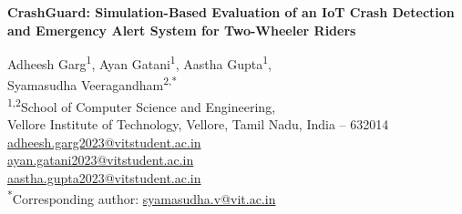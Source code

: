 \documentclass[10pt,a4paper]{article}
\begin{document}
\begin{center}
{\LARGE\bfseries CrashGuard: Simulation-Based Evaluation of an IoT Crash Detection and Emergency Alert System for Two-Wheeler Riders\par}
\vspace{6mm}
Adheesh Garg\textsuperscript{1}, Ayan Gatani\textsuperscript{1}, Aastha Gupta\textsuperscript{1},\\
Syamasudha Veeragandham\textsuperscript{2,*}\\[3mm]
\textsuperscript{1,2}School of Computer Science and Engineering,\\
Vellore Institute of Technology, Vellore, Tamil Nadu, India -- 632014\\[3mm]
{\small\href{mailto:adheesh.garg2023@vitstudent.ac.in}{adheesh.garg2023@vitstudent.ac.in}\\
\href{mailto:ayan.gatani2023@vitstudent.ac.in}{ayan.gatani2023@vitstudent.ac.in}\\
\href{mailto:aastha.gupta2023@vitstudent.ac.in}{aastha.gupta2023@vitstudent.ac.in}\\
\textsuperscript{*}Corresponding author: \href{mailto:syamasudha.v@vit.ac.in}{syamasudha.v@vit.ac.in}}\\[3mm]
\end{center}
\end{document}
